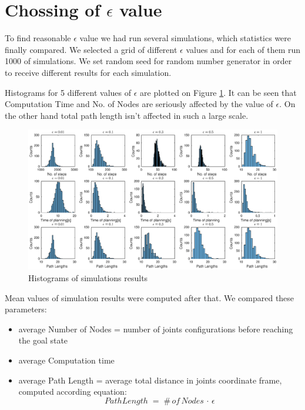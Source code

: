 \documentclass[11pt]{article}
\numberwithin{equation}{section}
\begin{document}
\newpage
\section{Chossing of $\epsilon$ value}
To find reasonable $\epsilon$ value we had run several simulations, which statistics were finally compared. We selected a grid of different $\epsilon$ values and for each of them run 1000 of simulations. We set random seed for random number generator in order to receive different results for each simulation. 

Histograms for 5 different values of $\epsilon$ are plotted on Figure \ref{fig::histograms}. It can be seen that Computation Time and No. of Nodes are seriously affected by the value of $\epsilon$. On the other hand total path length isn't affected in such a large scale.
\begin{figure}[h]
	\centering
	\hspace*{-2cm}
	\includegraphics[width = 20cm]{fig/Histograms.eps}
	\caption{Histograms of simulations results}
	\label{fig::histograms}
\end{figure}

Mean values of simulation results were computed after that. We compared these parameters:

\begin{itemize}
	\item average Number of Nodes = number of joints configurations before reaching the goal state
	\item average Computation time
	\item average Path Length = average total distance in joints coordinate frame, computed according equation:
	$$ Path Length\; =\; \#\, of\, Nodes\, \cdot \, \epsilon$$
\end{itemize} 
\end{document}
